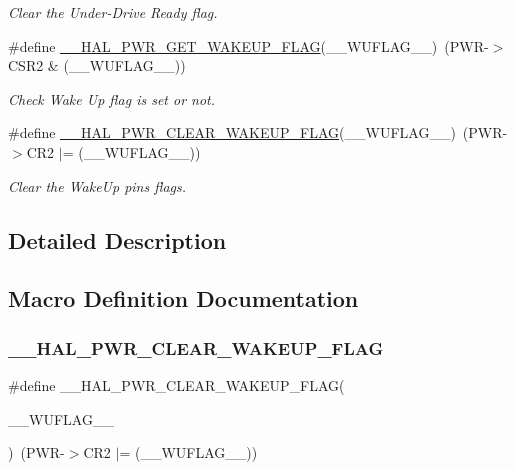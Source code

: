 \begin{DoxyCompactItemize}
\begin{DoxyCompactList}\small\item\em Clear the Under-\/\+Drive Ready flag. \end{DoxyCompactList}\item 
\#define \mbox{\hyperlink{group___p_w_r_ex___exported___macro_ga4f35c4eed3de35db5422548943cf8b1b}{\+\_\+\+\_\+\+H\+A\+L\+\_\+\+P\+W\+R\+\_\+\+G\+E\+T\+\_\+\+W\+A\+K\+E\+U\+P\+\_\+\+F\+L\+AG}}(\+\_\+\+\_\+\+W\+U\+F\+L\+A\+G\+\_\+\+\_\+)~(P\+WR-\/$>$C\+S\+R2 \& (\+\_\+\+\_\+\+W\+U\+F\+L\+A\+G\+\_\+\+\_\+))
\begin{DoxyCompactList}\small\item\em Check Wake Up flag is set or not. \end{DoxyCompactList}\item 
\#define \mbox{\hyperlink{group___p_w_r_ex___exported___macro_gaf8743ab41addcd227d879ea209062f77}{\+\_\+\+\_\+\+H\+A\+L\+\_\+\+P\+W\+R\+\_\+\+C\+L\+E\+A\+R\+\_\+\+W\+A\+K\+E\+U\+P\+\_\+\+F\+L\+AG}}(\+\_\+\+\_\+\+W\+U\+F\+L\+A\+G\+\_\+\+\_\+)~(P\+WR-\/$>$C\+R2 $\vert$=  (\+\_\+\+\_\+\+W\+U\+F\+L\+A\+G\+\_\+\+\_\+))
\begin{DoxyCompactList}\small\item\em Clear the Wake\+Up pins flags. \end{DoxyCompactList}\end{DoxyCompactItemize}


\subsection{Detailed Description}


\subsection{Macro Definition Documentation}
\mbox{\label{group___p_w_r_ex___exported___macro_gaf8743ab41addcd227d879ea209062f77}} 
\subsubsection{\texorpdfstring{\_\_HAL\_PWR\_CLEAR\_WAKEUP\_FLAG}{\_\_HAL\_PWR\_CLEAR\_WAKEUP\_FLAG}}
{\footnotesize\ttfamily \#define \+\_\+\+\_\+\+H\+A\+L\+\_\+\+P\+W\+R\+\_\+\+C\+L\+E\+A\+R\+\_\+\+W\+A\+K\+E\+U\+P\+\_\+\+F\+L\+AG(\begin{DoxyParamCaption}\item[{}]{\+\_\+\+\_\+\+W\+U\+F\+L\+A\+G\+\_\+\+\_\+ }\end{DoxyParamCaption})~(P\+WR-\/$>$C\+R2 $\vert$=  (\+\_\+\+\_\+\+W\+U\+F\+L\+A\+G\+\_\+\+\_\+))}



